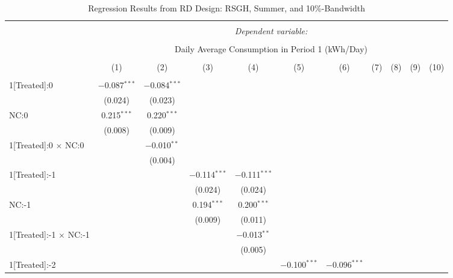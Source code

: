 \begin{table}[!htbp]
\centering 
\caption{Regression Results from RD Design: RSGH, Summer, and 10\%-Bandwidth} 
\label{}
\footnotesize
\begin{adjustbox}{scale = 0.75}
\begin{tabular}{@{\extracolsep{5pt}}lcccccccccc} 
\\[-1.8ex]\hline 
\hline \\[-1.8ex] 
 & \multicolumn{10}{c}{\textit{Dependent variable:}} \\ 
\cline{2-11} 
\\[-1.8ex] & \multicolumn{10}{c}{Daily Average Consumption in Period 1 (kWh/Day)} \\ 
\\[-1.8ex] & (1) & (2) & (3) & (4) & (5) & (6) & (7) & (8) & (9) & (10)\\ 
\hline \\[-1.8ex] 
 1[Treated]:0 & $-$0.087$^{***}$ & $-$0.084$^{***}$ &  &  &  &  &  &  &  &  \\ 
  & (0.024) & (0.023) &  &  &  &  &  &  &  &  \\ 
 NC:0 & 0.215$^{***}$ & 0.220$^{***}$ &  &  &  &  &  &  &  &  \\ 
  & (0.008) & (0.009) &  &  &  &  &  &  &  &  \\ 
 1[Treated]:0 $\times$ NC:0 &  & $-$0.010$^{**}$ &  &  &  &  &  &  &  &  \\ 
  &  & (0.004) &  &  &  &  &  &  &  &  \\ 
 1[Treated]:-1 &  &  & $-$0.114$^{***}$ & $-$0.111$^{***}$ &  &  &  &  &  &  \\ 
  &  &  & (0.024) & (0.024) &  &  &  &  &  &  \\ 
 NC:-1 &  &  & 0.194$^{***}$ & 0.200$^{***}$ &  &  &  &  &  &  \\ 
  &  &  & (0.009) & (0.011) &  &  &  &  &  &  \\ 
 1[Treated]:-1 $\times$ NC:-1 &  &  &  & $-$0.013$^{**}$ &  &  &  &  &  &  \\ 
  &  &  &  & (0.005) &  &  &  &  &  &  \\ 
 1[Treated]:-2 &  &  &  &  & $-$0.100$^{***}$ & $-$0.096$^{***}$ &  &  &  &  \\ 

\end{tabular}
\end{adjustbox}
\end{table}
